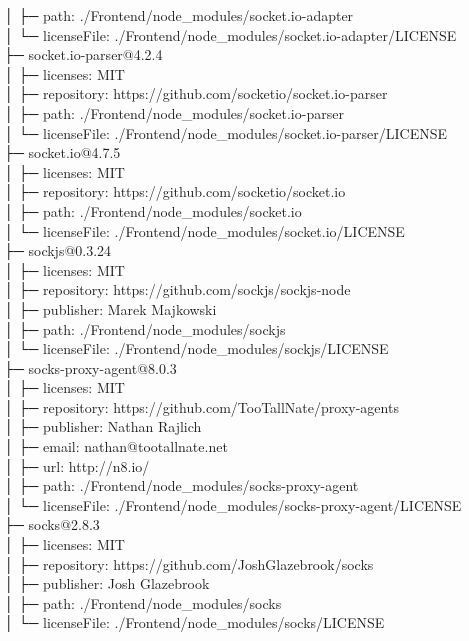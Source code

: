 │  ├─ path: ./Frontend/node\_modules/socket.io-adapter\\
│  └─ licenseFile: ./Frontend/node\_modules/socket.io-adapter/LICENSE\\
├─ socket.io-parser@4.2.4\\
│  ├─ licenses: MIT\\
│  ├─ repository: https://github.com/socketio/socket.io-parser\\
│  ├─ path: ./Frontend/node\_modules/socket.io-parser\\
│  └─ licenseFile: ./Frontend/node\_modules/socket.io-parser/LICENSE\\
├─ socket.io@4.7.5\\
│  ├─ licenses: MIT\\
│  ├─ repository: https://github.com/socketio/socket.io\\
│  ├─ path: ./Frontend/node\_modules/socket.io\\
│  └─ licenseFile: ./Frontend/node\_modules/socket.io/LICENSE\\
├─ sockjs@0.3.24\\
│  ├─ licenses: MIT\\
│  ├─ repository: https://github.com/sockjs/sockjs-node\\
│  ├─ publisher: Marek Majkowski\\
│  ├─ path: ./Frontend/node\_modules/sockjs\\
│  └─ licenseFile: ./Frontend/node\_modules/sockjs/LICENSE\\
├─ socks-proxy-agent@8.0.3\\
│  ├─ licenses: MIT\\
│  ├─ repository: https://github.com/TooTallNate/proxy-agents\\
│  ├─ publisher: Nathan Rajlich\\
│  ├─ email: nathan@tootallnate.net\\
│  ├─ url: http://n8.io/\\
│  ├─ path: ./Frontend/node\_modules/socks-proxy-agent\\
│  └─ licenseFile: ./Frontend/node\_modules/socks-proxy-agent/LICENSE\\
├─ socks@2.8.3\\
│  ├─ licenses: MIT\\
│  ├─ repository: https://github.com/JoshGlazebrook/socks\\
│  ├─ publisher: Josh Glazebrook\\
│  ├─ path: ./Frontend/node\_modules/socks\\
│  └─ licenseFile: ./Frontend/node\_modules/socks/LICENSE\\
